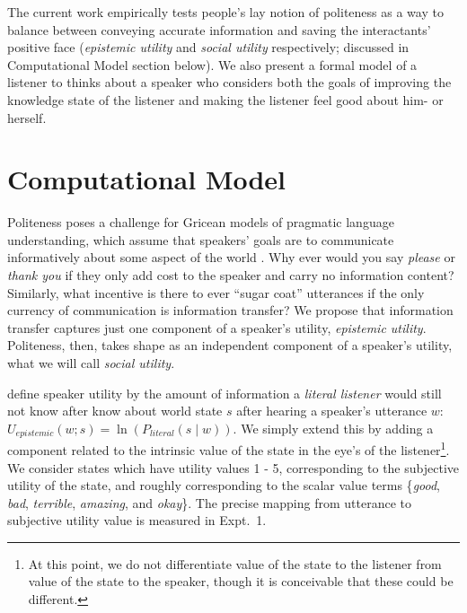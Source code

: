 \documentclass[10pt,letterpaper]{article}
\begin{document}
The current work empirically tests people's lay notion of politeness as a way to balance between conveying accurate information and saving the interactants' positive face (\emph{epistemic utility} and \emph{social utility} respectively; discussed in Computational Model section below). We also present a formal model of a listener to thinks about a speaker who considers both the goals of improving the knowledge state of the listener and making the listener feel good about him- or herself. 


\section{Computational Model}

Politeness poses a challenge for Gricean models of pragmatic language understanding, which assume that speakers' goals are to communicate informatively about some aspect of the world \cite{Frank2012, Goodman2013}. 
Why ever would you say \emph{please} or \emph{thank you} if they only add cost to the speaker and carry no information content?
Similarly, what incentive is there to ever ``sugar coat'' utterances if the only currency of communication is information transfer? 
We propose that information transfer captures just one component of a speaker's utility, \emph{epistemic utility}.
Politeness, then, takes shape as an independent component of a speaker's utility, what we will call \emph{social utility}. 

 define speaker utility by the amount of information a \emph{literal listener} would still not know after know about world state $s$ after hearing a speaker's utterance $w$: 
$U_{epistemic}(w; s) = \ln(P_{literal}(s \mid w)) $.
We simply extend this by adding a component related to the intrinsic value of the state in the eye's of the listener\footnote{At this point, we do not differentiate value of the state to the listener from value of the state to the speaker, though it is conceivable that these could be different.}.
We consider states which have utility values 1 - 5, corresponding to the subjective utility of the state, and roughly corresponding to the scalar value terms \{\emph{good}, \emph{bad}, \emph{terrible}, \emph{amazing}, and \emph{okay}\}. 
The precise mapping from utterance to subjective utility value is measured in Expt.~1.
\end{document}
